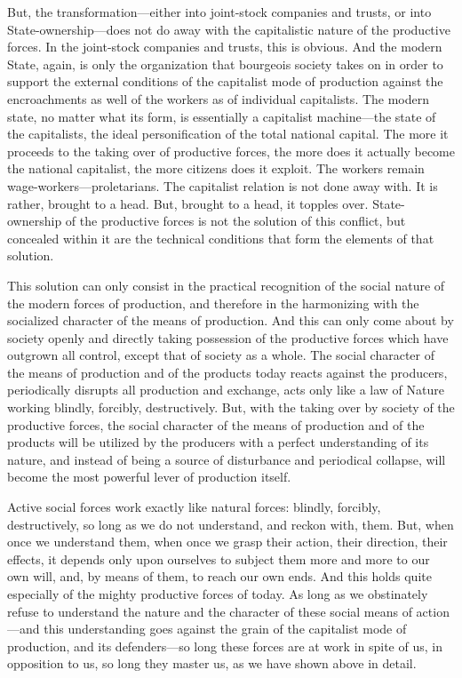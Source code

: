 But, the transformation---either into joint-stock companies and trusts, or into
State-ownership---does not do away with the capitalistic nature of the
productive forces. In the joint-stock companies and trusts, this is obvious. And
the modern State, again, is only the organization that bourgeois society takes
on in order to support the external conditions of the capitalist mode of
production against the encroachments as well of the workers as of individual
capitalists. The modern state, no matter what its form, is essentially a
capitalist machine---the state of the capitalists, the ideal personification of
the total national capital. The more it proceeds to the taking over of
productive forces, the more does it actually become the national capitalist, the
more citizens does it exploit. The workers remain wage-workers---proletarians.
The capitalist relation is not done away with. It is rather, brought to a head.
But, brought to a head, it topples over. State-ownership of the productive
forces is not the solution of this conflict, but concealed within it are the
technical conditions that form the elements of that solution.

This solution can only consist in the practical recognition of the social nature
of the modern forces of production, and therefore in the harmonizing with the
socialized character of the means of production. And this can only come about
by society openly and directly taking possession of the productive forces which
have outgrown all control, except that of society as a whole. The social
character of the means of production and of the products today reacts against
the producers, periodically disrupts all production and exchange, acts only
like a law of Nature working blindly, forcibly, destructively. But, with the
taking over by society of the productive forces, the social character of the
means of production and of the products will be utilized by the producers with a
perfect understanding of its nature, and instead of being a source of
disturbance and periodical collapse, will become the most powerful lever of
production itself. 

Active social forces work exactly like natural forces: blindly, forcibly,
destructively, so long as we do not understand, and reckon with, them. But, when
once we understand them, when once we grasp their action, their direction, their
effects, it depends only upon ourselves to subject them more and more to our own
will, and, by means of them, to reach our own ends. And this holds quite
especially of the mighty productive forces of today. As long as we obstinately
refuse to understand the nature and the character of these social means of
action---and this understanding goes against the grain of the capitalist mode of
production, and its defenders---so long these forces are at work in spite of us,
in opposition to us, so long they master us, as we have shown above in detail.

